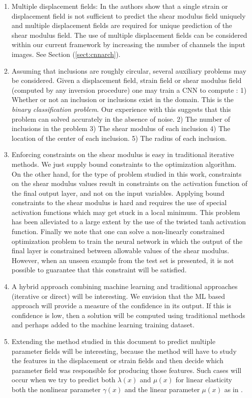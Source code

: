 \documentclass[10pt]{article}
\begin{document}
\begin{enumerate}
\item{Multiple displacement fields: In \cite{paper:barbonegokhale,paper:barbonebamber} the authors show that a single strain or displacement field is not sufficient to predict the shear modulus field uniquely and multiple displacement fields are required for unique prediction of the shear modulus field. The use of multiple displacement fields can be considered within our current framework by increasing the number of channels the input images. See Section (\ref{sect:cnnarch}).} 
\item{Assuming that inclusions are roughly circular, several auxiliary problems may be considered. Given a displacement field, strain field or shear modulus field (computed by any inversion procedure) one may train a CNN to compute : 1) Whether or not an inclusion or inclusions exist  in the domain. This is the \textit{binary classification problem}. Our experience with this suggests that this problem can solved accurately in the absence of noise. 2) The number of inclusions in the problem 3) The shear modulus of each inclusion 4) The location of the center of each inclusion. 5) The radius of each inclusion.}
\item{Enforcing constraints on the shear modulus is easy in traditional iterative methods. We just supply bound constraints to the optimization algorithm. On the other hand, for the type of problem studied in this work, constraints on the shear modulus values result in constraints on the activation function of the final output layer, and not on the input variables. Applying bound constraints to the shear modulus is hard and requires the use of special activation functions which may get stuck in a local minimum. This problem has been alleviated to a large extent by the use of the twisted tanh activation function. Finally we note that one can solve a non-linearly constrained optimization problem to train the neural network in which the output of the final layer is constrained between allowable values of the shear modulus. However, when an unseen example from the test set is presented, it is not possible to guarantee that this constraint will be satisfied.}
\item{A hybrid approach combining machine learning and traditional approaches (iterative or direct) will be interesting. We envision that the ML based approach will provide a measure of the confidence in its output. If this is confidence is low, then a solution will be computed using traditional methods and perhaps added to the machine learning training dataset.}
\item{Extending the method studied in this document to predict multiple parameter fields will be interesting, because the method will have to study the features in the displacement or strain fields and then decide which parameter field was responsible for producing those features. Such cases will occur when we try to predict both $\lambda(x)$ and $\mu(x)$ for linear elasticity both the nonlinear parameter $\gamma(x)$ and the linear parameter $\mu(x)$ as in \cite{paper:gokhale2008}}.

\end{enumerate}
\end{document}
